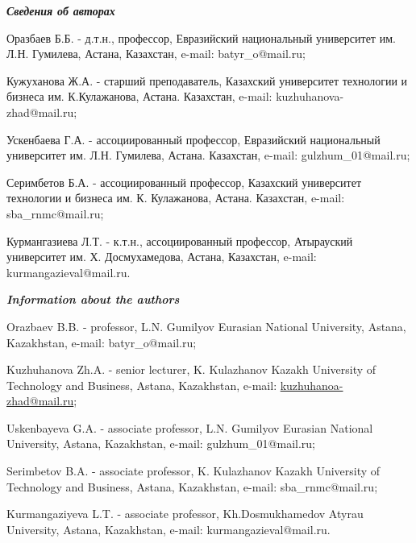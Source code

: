 \begin{info}
\hspace{1em}\emph{{\bfseries Сведения об авторах}}

Оразбаев Б.Б. - д.т.н., профессор, Евразийский национальный
университет им. Л.Н. Гумилева, Астана, Казахстан, e-mail:
batyr\_o@mail.ru;

Кужуханова Ж.А. - старший преподаватель, Казахский университет
технологии и бизнеса им. К.Кулажанова, Астана. Казахстан, e-mail:
kuzhuhanova-zhad@mail.ru;

Ускенбаева Г.А. - ассоциированный профессор, Евразийский национальный
университет им. Л.Н. Гумилева, Астана. Казахстан, e-mail:
gulzhum\_01@mail.ru;

Серимбетов Б.А. - ассоциированный профессор, Казахский университет
технологии и бизнеса им. К. Кулажанова, Астана. Казахстан, e-mail:
sba\_rnmc@mail.ru;

Курмангазиева Л.Т. - к.т.н., ассоциированный профессор, Атырауский
университет им. Х. Досмухамедова, Астана, Казахстан, e-mail:
kurmangazieval@mail.ru.

\hspace{1em}\emph{{\bfseries Information about the authors}}

Orazbaev B.B. - professor, L.N. Gumilyov Eurasian National University,
Astana, Kazakhstan, e-mail: batyr\_o@mail.ru;

Kuzhuhanova Zh.A. - senior lecturer, K. Kulazhanov Kazakh University
of Technology and Business, Astana, Kazakhstan, e-mail:
\href{mailto:kuzhuhanova-zhad@mail.ru}{kuzhuhanoa-zhad@mail.ru};

Uskenbayeva G.A. - associate professor, L.N. Gumilyov Eurasian
National University, Astana, Kazakhstan, e-mail: gulzhum\_01@mail.ru;

Serimbetov B.A. - associate professor, K. Kulazhanov Kazakh University
of Technology and Business, Astana, Kazakhstan, e-mail:
sba\_rnmc@mail.ru;

Kurmangaziyeva L.T. - associate professor, Kh.Dosmukhamedov Atyrau
University, Astana, Kazakhstan, e-mail: kurmangazieval@mail.ru.
\end{info}
